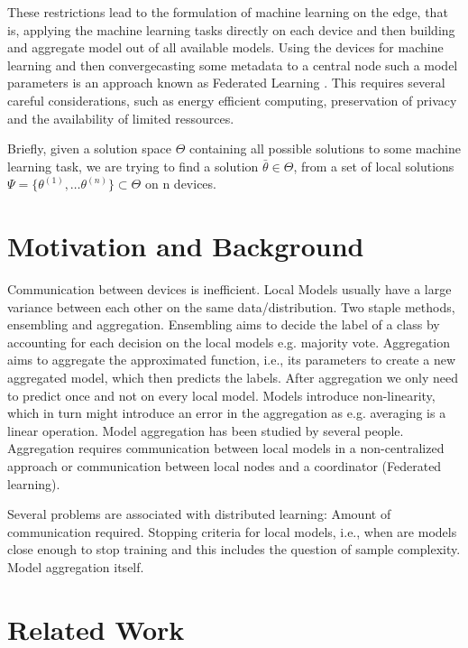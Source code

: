 These restrictions lead to the formulation of machine learning on the edge, that is, applying the machine learning tasks directly on each device and then building and aggregate model out of all available models.
Using the devices for machine learning and then convergecasting some metadata to a central node such a model parameters is an approach known as Federated Learning .
This requires several careful considerations, such as energy efficient computing, preservation of privacy and the availability of limited ressources.


Briefly, given a solution space $\Theta$ containing all possible solutions to some machine learning task, we are trying to find a solution $\bar{\theta} \in \Theta$, from a set of local solutions $\Psi = \{\theta^{(1)}, \ldots \theta^{(n)}\} \subset \Theta$ on n devices.



\section{Motivation and Background}
Communication between devices is inefficient.
Local Models usually have a large variance between each other on the same data/distribution.
Two staple methods, ensembling and aggregation.
Ensembling aims to decide the label of a class by accounting for each decision on the local models e.g. majority vote.
Aggregation aims to aggregate the approximated function, i.e., its parameters to create a new aggregated model, which then predicts the labels.
After aggregation we only need to predict once and not on every local model.
Models introduce non-linearity, which in turn might introduce an error in the aggregation as e.g. averaging is a linear operation.
Model aggregation has been studied by several people.
Aggregation requires communication between local models in a non-centralized approach or communication between local nodes and a coordinator (Federated learning).

Several problems are associated with distributed learning:
Amount of communication required.
Stopping criteria for local models, i.e., when are models close enough to stop training and this includes the question of sample complexity.
Model aggregation itself.


\section{Related Work}

